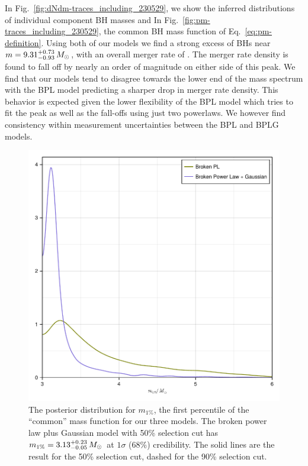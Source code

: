 \documentclass[modern]{aastex631}
\begin{document}
In Fig.~\ref{fig:dNdm-traces_including_230529}, we show the inferred
distributions of individual component BH masses and In
Fig.~\ref{fig:pm-traces_including_230529}, the common BH mass function of
Eq.~\eqref{eq:pm-definition}. Using both of our models we find a strong excess
of BHs near $m=9.31^{+0.73}_{-0.93} \, M_\odot$, with an overall merger rate of
\dNlogmpeakincludingnewunits.  The merger rate
density is found to fall off by nearly an order of magnitude on either side of
this peak. We find that our models tend to disagree towards the lower end of the
mass spectrum with the BPL model predicting a sharper drop in merger rate
density. This behavior is expected given the lower flexibility of the BPL model
which tries to fit the peak as well as the fall-offs using just two powerlaws.
We however find consistency within measurement uncertainties between the BPL and
BPLG models.

\begin{figure}
    \includegraphics[width=\columnwidth]{figures/m1pct_including_230529.pdf}
    \caption{\label{fig:m1pct_including_230529} The posterior distribution for $m_{1\%}$, the
    first percentile of the ``common'' mass function for our three models.  The
    broken power law plus Gaussian model with 50\% selection cut has $m_{1\%} =
    3.13^{+0.23}_{-0.05} \, M_\odot$ at $1\sigma$ (68\%) credibility.  The solid lines are
    the result for the 50\% selection cut, dashed for the 90\% selection cut.}
\end{figure}
\end{document}
